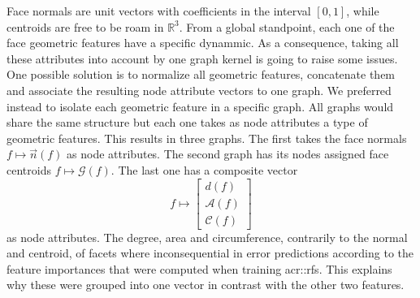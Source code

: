         Face normals are unit vectors with coefficients in the interval \([0, 1]\), while centroids are free to be roam in \(\mathbb{R}^3\).
        From a global standpoint, each one of the face geometric features have a specific dynammic.
        As a consequence, taking all these attributes into account by one graph kernel is going to raise some issues.
        One possible solution is to normalize all geometric features, concatenate them and associate the resulting node attribute vectors to one graph.
        We preferred instead to isolate each geometric feature in a specific graph.
        All graphs would share the same structure but each one takes as node attributes a type of geometric features.
        This results in three graphs.
        The first takes the face normals \(f \mapsto \vec{n}\left(f\right)\) as node attributes.
        The second graph has its nodes assigned face centroids \(f \mapsto \mathscr{G}\left(f\right)\).
        The last one has a composite vector
        \begin{equation*}
            f \mapsto \begin{bmatrix}
                d\left(f\right)\\
                \mathscr{A}\left(f\right)\\
                \mathscr{C}\left(f\right)            
            \end{bmatrix}
        \end{equation*} as node attributes.
        The degree, area and circumference, contrarily to the normal and centroid, of facets where inconsequential in error predictions according to the feature importances that were computed when training \glspl{acr::rf}.
        This explains why these were grouped into one vector in contrast with the other two features.\\

